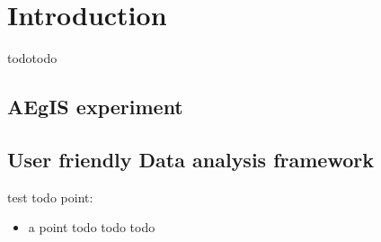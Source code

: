 
\chapter{Introduction} %

\label{Chapter1} %


todotodo 


\section{AEgIS experiment}





\section{User friendly Data analysis framework}

test todo point:

\begin{itemize}
\item 
a point todo todo todo
\end{itemize}
